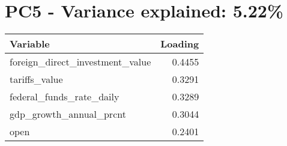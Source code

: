 \section*{PC5 - Variance explained: 5.22\%}
\begin{tabular}{lr}
\toprule
Variable & Loading \\
\midrule
foreign\_direct\_investment\_value & 0.4455 \\
tariffs\_value & 0.3291 \\
federal\_funds\_rate\_daily & 0.3289 \\
gdp\_growth\_annual\_prcnt & 0.3044 \\
open & 0.2401 \\
\bottomrule
\end{tabular}

